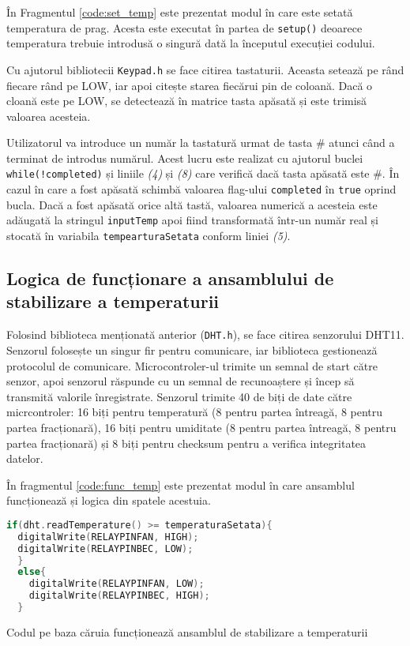 În Fragmentul \ref{code:set_temp} este prezentat modul în care este setată temperatura de prag. Acesta este executat în partea de \texttt{setup()} deoarece temperatura trebuie introdusă o singură dată la începutul execuției codului.

Cu ajutorul bibliotecii \texttt{Keypad.h} se face citirea tastaturii. Aceasta setează pe rând fiecare rând pe LOW, iar apoi citește starea fiecărui pin de coloană. Dacă o cloană este pe LOW, se detectează în matrice tasta apăsată și este trimisă valoarea acesteia.

Utilizatorul va introduce un număr la tastatură urmat de tasta \# atunci când a terminat de introdus numărul. Acest lucru este realizat cu ajutorul buclei \texttt{while(!completed)} și liniile \textit{(4)} și \textit{(8)} care verifică dacă tasta apăsată este \#. În cazul în care a fost apăsată schimbă valoarea flag-ului \texttt{completed} în \texttt{true} oprind bucla. Dacă a fost apăsată orice altă tastă, valoarea numerică a acesteia este adăugată la stringul \texttt{inputTemp} apoi fiind transformată într-un număr real și stocată în variabila \texttt{tempearturaSetata} conform liniei \textit{(5)}.

\subsection{Logica de funcționare a ansamblului de stabilizare a temperaturii}

Folosind biblioteca menționată anterior (\texttt{DHT.h}), se face citirea senzorului DHT11. Senzorul folosește un singur fir pentru comunicare, iar biblioteca gestionează protocolul de comunicare. Microcontroler-ul trimite un semnal de start către senzor, apoi senzorul răspunde cu un semnal de recunoaștere și încep să transmită valorile înregistrate. Senzorul trimite 40 de biți de date către micrcontroler: 16 biți pentru temperatură (8 pentru partea întreagă, 8 pentru partea fracționară), 16 biți pentru umiditate (8 pentru partea întreagă, 8 pentru partea fracționară) și 8 biți pentru checksum pentru a verifica integritatea datelor.

În fragmentul \ref{code:func_temp} este prezentat modul în care ansamblul funcționează și logica din spatele acestuia.

\begin{code}[H]
\begin{lstlisting}[language=C++]
if(dht.readTemperature() >= temperaturaSetata){
  digitalWrite(RELAYPINFAN, HIGH);
  digitalWrite(RELAYPINBEC, LOW);
  }
  else{
    digitalWrite(RELAYPINFAN, LOW);
    digitalWrite(RELAYPINBEC, HIGH);
  }
\end{lstlisting}
\caption{Codul pe baza căruia funcționează ansamblul de stabilizare a temperaturii}
\label{code:func_temp}
\end{code}

